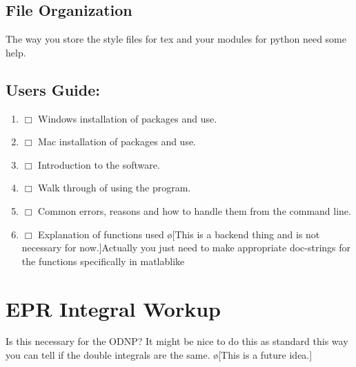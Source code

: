 \documentclass[10pt]{book}
\begin{document}
\section{File Organization}
The way you store the style files for tex and your modules for python need some help.
\section{Users Guide:}
\begin{enumerate}
    \item $\Box$ Windows installation of packages and use.
    \item $\Box$ Mac installation of packages and use.
    \item $\Box$ Introduction to the software.
    \item $\Box$ Walk through of using the program.
    \item $\Box$ Common errors, reasons and how to handle them from the command line.
    \item $\Box$ Explanation of functions used \o[This is a backend thing and is not necessary for now.]{Actually you just need to make appropriate doc-strings for the functions specifically in matlablike}
\end{enumerate}
\chapter{EPR Integral Workup}
Is this necessary for the ODNP? It might be nice to do this as standard this way you can tell if the double integrals are the same. \o[This is a future idea.]
\end{document}
